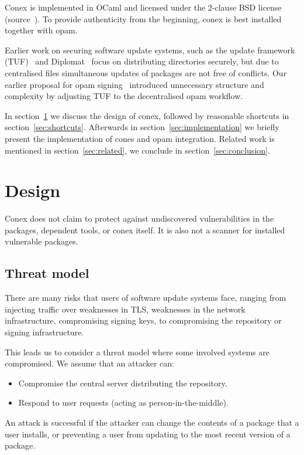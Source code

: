 \documentclass[nocopyrightspace]{sigplanconf}
\begin{document}
Conex is implemented in OCaml and licensed under the 2-clause BSD license (source~\cite{conex}).
To provide authenticity from the beginning, conex is best installed together with opam.

Earlier work on securing software update systems, such as the update framework (TUF)~\cite{tuf} and Diplomat~\cite{diplomat} focus on distributing directories securely, but due to centralised files simultaneous updates of packages are not free of conflicts.
Our earlier proposal for opam signing~\cite{opamsigning} introduced unnecessary structure and complexity by adjusting TUF to the decentralised opam workflow.

In section~\ref{sec:design} we discuss the design of conex, followed by reasonable shortcuts in section~\ref{sec:shortcuts}.
Afterwards in section~\ref{sec:implementation} we briefly present the implementation of cones and opam integration.
Related work is mentioned in section~\ref{sec:related}, we conclude in section~\ref{sec:conclusion}.

\section{Design} \label{sec:design}
Conex does not claim to protect against undiscovered vulnerabilities in the packages, dependent tools, or conex itself.
It is also not a scanner for installed vulnerable packages.

\subsection{Threat model}
There are many risks that users of software update systems face, ranging from injecting traffic over weaknesses in TLS, weaknesses in the network infrastructure, compromising signing keys, to compromising the repository or signing infrastructure.

This leads us to consider a threat model where some involved systems are compromised.  We assume that an attacker can:
\begin{itemize}
  \item Compromise the central server distributing the repository.
  \item Respond to user requests (acting as person-in-the-middle).
\end{itemize}

An attack is successful if the attacker can change the contents of a package that a user installs, or preventing a user from updating to the most recent version of a package.
\end{document}
